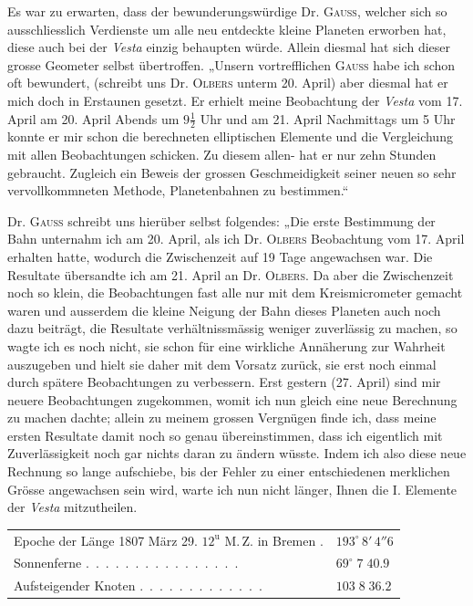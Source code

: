\par\indent Es war zu erwarten, dass der bewunderungswürdige Dr. \textsc{Gauss}, welcher sich so ausschliesslich Verdienste um alle neu entdeckte kleine Planeten erworben hat, diese auch bei der \emph{Vesta} einzig behaupten würde. Allein diesmal hat sich dieser grosse Geometer selbst übertroffen. „Unsern vortrefflichen \textsc{Gauss} habe ich schon oft bewundert, (schreibt uns Dr. \textsc{Olbers} unterm 20. April) aber diesmal hat er mich doch in Erstaunen gesetzt. Er erhielt meine Beobachtung der \emph{Vesta} vom 17. April am 20. April Abends um $9\tfrac{1}{2}$ Uhr und am 21. April Nachmittags um 5 Uhr konnte er mir schon die berechneten elliptischen Elemente und die Vergleichung mit allen Beobachtungen schicken. Zu diesem allen-
%
hat er nur zehn Stunden gebraucht. Zugleich ein Beweis der grossen Geschmeidigkeit seiner neuen so sehr vervollkommneten Methode, Planetenbahnen zu bestimmen.“

\par\indent Dr. \textsc{Gauss} schreibt uns hierüber selbst folgendes: „Die erste Bestimmung der Bahn unternahm ich am 20. April, als ich Dr. \textsc{Olbers} Beobachtung vom 17. April erhalten hatte, wodurch die Zwischenzeit auf 19 Tage angewachsen war. Die Resultate übersandte ich am 21. April an Dr. \textsc{Olbers}. Da aber die Zwischenzeit noch so klein, die Beobachtungen fast alle nur mit dem Kreismicrometer gemacht waren und ausserdem die kleine Neigung der Bahn dieses Planeten auch noch dazu beiträgt, die Resultate verhältnissmässig weniger zuverlässig zu machen, so wagte ich es noch nicht, sie schon für eine wirkliche Annäherung zur Wahrheit auszugeben und hielt sie daher mit dem Vorsatz zurück, sie erst noch einmal durch spätere Beobachtungen zu verbessern. Erst gestern (27. April) sind mir neuere Beobachtungen zugekommen, womit ich nun gleich eine neue Berechnung zu machen dachte; allein zu meinem grossen Vergnügen finde ich, dass meine ersten Resultate damit noch so genau übereinstimmen, dass ich eigentlich mit Zuverlässigkeit noch gar nichts daran zu ändern wüsste. Indem ich also diese neue Rechnung so lange aufschiebe, bis der Fehler zu einer entschiedenen merklichen Grösse angewachsen sein wird, warte ich nun nicht länger, Ihnen die I. Elemente der \emph{Vesta} mitzutheilen.

\begin{center}\begingroup\fontsize{9}{11}\selectfont
\begin{tabular}{ll}
\shortstack[l]{Epoche der Länge 1807 März 29.\\$12^{\text{u}}$ M.\,Z. in Bremen} . & $193^\circ\,8'\,4''6$ \\
Sonnenferne .\ .\ .\ .\ .\ .\ .\ .\ .\ .\ .\ .\ .\ .\ .\ . & $69^\circ\;7\;40.9$ \\
Aufsteigender Knoten .\ .\ .\ .\ .\ .\ .\ .\ .\ .\ .\ .\ . & $103\;8\;36.2$
\end{tabular}\endgroup\end{center}

